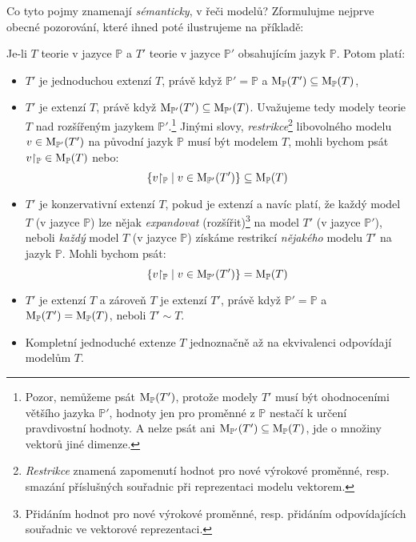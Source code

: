 Co tyto pojmy znamenají \emph{sémanticky}, v řeči modelů? Zformulujme nejprve obecné pozorování, které ihned poté ilustrujeme na příkladě:
\begin{observation}\label{observation:extensions-semantic-description-propositional}
    Je-li $T$ teorie v jazyce $\mathbb P$ a $T'$ teorie v jazyce $\mathbb P'$ obsahujícím jazyk $\mathbb P$. Potom platí:
    \begin{itemize}
        \item $T'$ je jednoduchou extenzí $T$, právě když $\mathbb P'=\mathbb P$ a $\operatorname{M}_\mathbb P(T')\subseteq\operatorname{M}_\mathbb P(T)$,
        \item $T'$ je extenzí $T$, právě když $\operatorname{M}_{\mathbb P'}(T')\subseteq\operatorname{M}_{\mathbb P'}(T)$. Uvažujeme tedy modely teorie $T$ nad rozšířeným jazykem $\mathbb P'$.\footnote{Pozor, nemůžeme psát $\operatorname{M}_\mathbb P(T')$, protože modely $T'$ musí být ohodnoceními většího jazyka $\mathbb P'$, hodnoty jen pro proměnné z $\mathbb P$ nestačí k určení pravdivostní hodnoty. A nelze psát ani $\operatorname{M}_{\mathbb P'}(T')\subseteq\operatorname{M}_{\mathbb P}(T)$, jde o množiny vektorů jiné dimenze.} Jinými slovy, \emph{restrikce}\footnote{\emph{Restrikce} znamená zapomenutí hodnot pro nové výrokové proměnné, resp. smazání příslušných souřadnic při reprezentaci modelu vektorem.} libovolného modelu $v\in\operatorname{M}_{\mathbb P'}(T')$ na původní jazyk $\mathbb P$ musí být modelem $T$, mohli bychom psát $v{\restriction_\mathbb P}\in\operatorname{M}_\mathbb P(T)$ nebo:
        $$
        \{v{\restriction_\mathbb P}\mid v\in\operatorname{M}_{\mathbb P'}(T')\}\subseteq\operatorname{M}_\mathbb P(T)
        $$
        \item $T'$ je konzervativní extenzí $T$, pokud je extenzí a navíc platí, že každý model $T$ (v jazyce $\mathbb P$) lze nějak \emph{expandovat} (rozšířit)\footnote{Přidáním hodnot pro nové výrokové proměnné, resp. přidáním odpovídajících souřadnic ve vektorové reprezentaci.} na model $T'$ (v jazyce $\mathbb P'$), neboli \emph{každý} model $T$ (v jazyce $\mathbb P$) získáme restrikcí \emph{nějakého} modelu $T'$ na jazyk $\mathbb P$. Mohli bychom psát:
        $$
        \{v{\restriction_\mathbb P}\mid v\in\operatorname{M}_      {\mathbb P'}(T')\}=\operatorname{M}_\mathbb P(T)
        $$
        \item $T'$ je extenzí $T$ a zároveň $T$ je extenzí $T'$, právě když $\mathbb P'=\mathbb P$ a $\operatorname{M}_\mathbb P(T')=\operatorname{M}_\mathbb P(T)$, neboli $T'\sim T$.        
        \item Kompletní jednoduché extenze $T$ jednoznačně až na ekvivalenci odpovídají modelům $T$.
    \end{itemize}
\end{observation}

